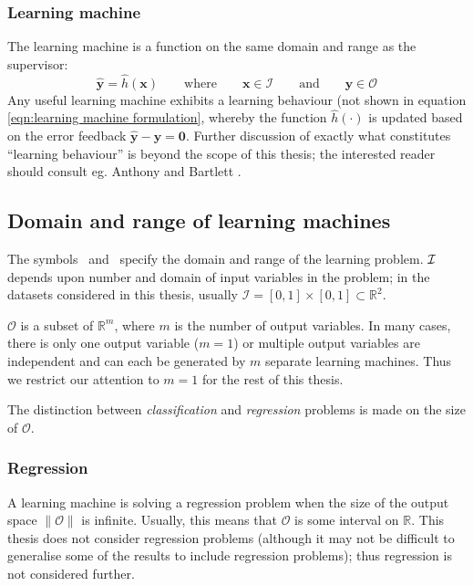 \subsubsection{Learning machine}
\label{sec:learning machine}

The learning machine is a function on the same domain and
range as the supervisor:
%
\begin{equation}
\mathbf{\hat{y}} = \hat{h}(\mathbf{x}) \qquad \mbox{where} \qquad
\mathbf{x} \in \mathcal{I} \qquad \mbox{and} \qquad \mathbf{y} \in
\mathcal{O}
\label{eqn:learning machine formulation}
\end{equation}
%
Any useful learning machine exhibits a learning behaviour (not shown in
equation \ref{eqn:learning machine formulation}, whereby the function
$\hat{h}(\cdot)$ is updated based on the error feedback
$\mathbf{\hat{y} - y = 0}$.  Further discussion of exactly what
constitutes ``learning behaviour'' is beyond the scope of this thesis;
the interested reader should consult eg. Anthony and Bartlett
\cite{Anthony99}.


\subsection{Domain and range of learning machines}

The symbols \calI\ and \calO\ specify the domain and
range of the learning problem.  $\mathcal{I}$ depends upon number and
domain of input variables in the problem; in the datasets considered in
this thesis, usually $\mathcal{I} = [0,1] \times [0,1] \subset
\mathbb{R}^2$.

$\mathcal{O}$ is a subset of $\mathbb{R}^m$, where $m$ is the number
of output variables.  In many cases, there is only one output
variable ($m=1$) or multiple output variables are independent and
can each be generated by $m$ separate learning machines.
Thus we restrict our attention to $m=1$ for the rest of this thesis.

The distinction between \emph{classification} and \emph{regression}
problems is made on the size of $\mathcal{O}$.


\subsubsection{Regression}
\label{sec:regression}

A learning machine is solving a regression problem when the size of
the output space $\|\mathcal{O}\|$ is infinite.  Usually, this means
that $\mathcal{O}$ is some interval on $\mathbb{R}$.  This thesis does
not consider regression problems (although it may not be difficult to 
generalise some of the results to include regression problems); thus
regression is not considered further.


